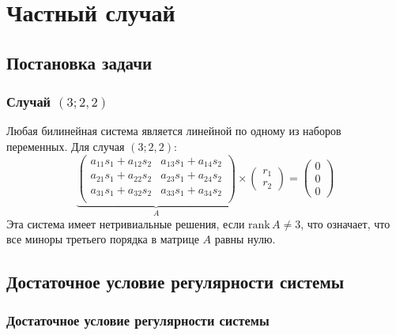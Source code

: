 \documentclass{beamer}
\begin{document}
\section{Частный случай}
\subsection{Постановка задачи}
\frame
{
	\frametitle{Случай $(3; 2, 2)$}
	Любая билинейная система является линейной по одному из наборов переменных. Для случая 	
	$(3;2, 2)$:
	$$
		\underbrace{
		\begin{pmatrix}
			a_{1 1} s_1 + a_{1 2} s_2 & a_{1 3} s_1 + a_{1 4} s_2 \\
			a_{2 1} s_1 + a_{2 2} s_2 & a_{2 3} s_1 + a_{2 4} s_2 \\
			a_{3 1} s_1 + a_{3 2} s_2 & a_{3 3} s_1 + a_{3 4} s_2 \\
		\end{pmatrix}}_{A}
		\times
		\begin{pmatrix}
			r_1 \\
			r_2
		\end{pmatrix}=
		\begin{pmatrix}
			0 \\
			0 \\
			0
		\end{pmatrix}
	$$
	Эта система имеет нетривиальные решения, если $\text{rank}\,A 
	\ne 3$, что означает, что все миноры третьего порядка в матрице $A$ равны нулю. 
}
\subsection{Достаточное условие регулярности системы}
\frame
{
	\frametitle{Достаточное условие регулярности системы}
	
}
\end{document}

